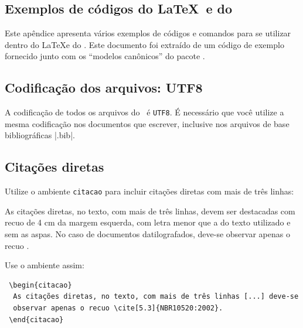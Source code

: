 \documentclass[12pt,oneside,a4paper,chapter=TITLE,english,brazil]{abntex2}
\begin{document}
\begin{anexosenv}


\chapter{Exemplos de códigos do \LaTeX\ e do \abnTeX}
\label{exemplos}

Este apêndice apresenta vários exemplos de códigos e comandos para se utilizar dentro do \LaTeX e do \abnTeX. Este documento foi extraído de um código de exemplo fornecido junto com os ``modelos canônicos'' do pacote \abnTeX.


\section{Codificação dos arquivos: UTF8}

A codificação de todos os arquivos do \abnTeX\ é \texttt{UTF8}. É necessário que você utilize a mesma codificação nos documentos que escrever, inclusive nos arquivos de base bibliográficas |.bib|.

\section{Citações diretas}
\label{sec-citacao}

Utilize o ambiente \texttt{citacao} para incluir citações diretas com mais de três linhas:
\begin{citacao}
  As citações diretas, no texto, com mais de três linhas, devem ser destacadas com recuo de 4 cm da margem esquerda, com letra menor que a do texto utilizado e sem as aspas. No caso de documentos datilografados, deve-se observar apenas o recuo \cite[5.3]{NBR10520:2002}.
\end{citacao}

Use o ambiente assim:
\begin{verbatim}
 \begin{citacao}
  As citações diretas, no texto, com mais de três linhas [...] deve-se
  observar apenas o recuo \cite[5.3]{NBR10520:2002}.
 \end{citacao}
\end{verbatim}


\end{anexosenv}
\end{document}
